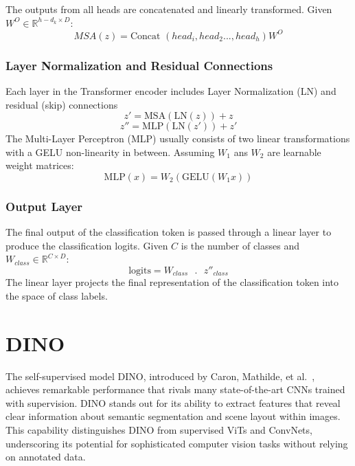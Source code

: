 The outputs from all heads are concatenated and linearly transformed. Given \(W^O \in \mathbb{R}^{h-d_k \times D } \):
\begin{equation}
	MSA(z) = \text{Concat  }(head_i, head_2..., head_h)W^O
\end{equation}

\subsubsection{Layer Normalization and Residual Connections}
Each layer in the Transformer encoder includes Layer Normalization (LN) and residual (skip) connections
\begin{equation}
	z' = \text{MSA}(\text{LN}(z)) + z
\end{equation}
\begin{equation}
	z'' = \text{MLP}(\text{LN}(z')) + z'
\end{equation}
The Multi-Layer Perceptron (MLP) usually consists of two linear transformations with a GELU non-linearity in between. Assuming \(W_1\) ans \(W_2\) are learnable weight matrices:
\begin{equation}
	\text{MLP}(x) = W_2(\text{GELU}(W_1x))
\end{equation}

\subsubsection{Output Layer}
The final output of the classification token is passed through a linear layer to produce the classification logits. Given \(C\) is the number of classes and \(W_{class} \in \mathbb{R}^{C \times D }\):
\begin{equation}
	\text{logits} = W_{class} \text{ }.\text{ } z''_{class}
\end{equation}
The linear layer projects the final representation of the classification token into the space of class labels.

\section{DINO}
The self-supervised model DINO, introduced by Caron, Mathilde, et al.~\cite{caron2021emerging}, achieves remarkable performance that rivals many state-of-the-art CNNs trained with supervision. DINO stands out for its ability to extract features that reveal clear information about semantic segmentation and scene layout within images. This capability distinguishes DINO from supervised ViTs and ConvNets, underscoring its potential for sophisticated computer vision tasks without relying on annotated data.

